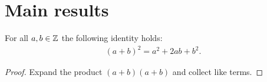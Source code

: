 \section{Main results}

\begin{theorem}\label{thm:key}
For all $a, b \in \mathbb{Z}$ the following identity holds:
\begin{align}
    (a + b)^2 = a^2 + 2ab + b^2.
\end{align}
\end{theorem}

\begin{proof}
Expand the product $(a + b)(a + b)$ and collect like terms.
\end{proof}
